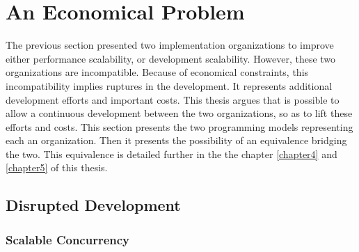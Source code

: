 \section{An Economical Problem} \label{chapter2:problem-statement}

The previous section presented two implementation organizations to improve either performance scalability, or development scalability.
However, these two organizations are incompatible.
Because of economical constraints, this incompatibility implies ruptures in the development.
It represents additional development efforts and important costs.
This thesis argues that is possible to allow a continuous development between the two organizations, so as to lift these efforts and costs.
This section presents the two programming models representing each an organization.
Then it presents the possibility of an equivalence bridging the two.
This equivalence is detailed further in the the chapter \ref{chapter4} and \ref{chapter5} of this thesis.










\subsection{Disrupted Development}


\subsubsection{Scalable Concurrency}


